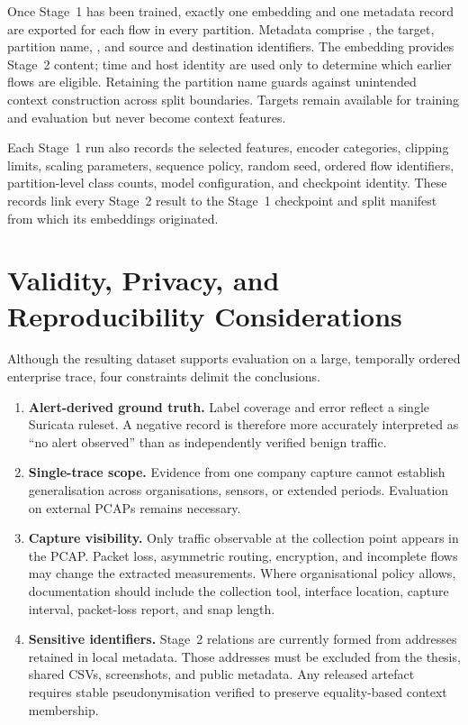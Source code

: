 \documentclass[11pt,fleqn]{report}
\begin{document}
Once Stage~1 has been trained, exactly one embedding and one metadata record are exported for each flow in every partition. Metadata comprise , the target, partition name, , and source and destination identifiers. The embedding provides Stage~2 content; time and host identity are used only to determine which earlier flows are eligible. Retaining the partition name guards against unintended context construction across split boundaries. Targets remain available for training and evaluation but never become context features.

Each Stage~1 run also records the selected features, encoder categories, clipping limits, scaling parameters, sequence policy, random seed, ordered flow identifiers, partition-level class counts, model configuration, and checkpoint identity. These records link every Stage~2 result to the Stage~1 checkpoint and split manifest from which its embeddings originated.

\section{Validity, Privacy, and Reproducibility Considerations}
\label{subsec:dataset_limitations}

Although the resulting dataset supports evaluation on a large, temporally ordered enterprise trace, four constraints delimit the conclusions.

\begin{enumerate}[label=\textbf{L\arabic*:},leftmargin=*]
    \item \textbf{Alert-derived ground truth.} Label coverage and error reflect a single Suricata ruleset. A negative record is therefore more accurately interpreted as ``no alert observed'' than as independently verified benign traffic.

    \item \textbf{Single-trace scope.} Evidence from one company capture cannot establish generalisation across organisations, sensors, or extended periods. Evaluation on external PCAPs remains necessary.

    \item \textbf{Capture visibility.} Only traffic observable at the collection point appears in the PCAP. Packet loss, asymmetric routing, encryption, and incomplete flows may change the extracted measurements. Where organisational policy allows, documentation should include the collection tool, interface location, capture interval, packet-loss report, and snap length.

    \item \textbf{Sensitive identifiers.} Stage~2 relations are currently formed from addresses retained in local metadata. Those addresses must be excluded from the thesis, shared CSVs, screenshots, and public metadata. Any released artefact requires stable pseudonymisation verified to preserve equality-based context membership.
\end{enumerate}
\end{document}
